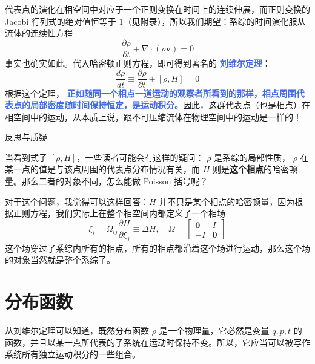 代表点的演化在相空间中对应于一个正则变换在时间上的连续伸展，而正则变换的Jacobi 行列式的绝对值恒等于 $1$（见附录），所以我们期望：系综的时间演化服从流体的连续性方程
\begin{equation}
    \frac{\partial \rho}{\partial t} + \nabla \cdot (\rho \bm{v}) = 0
\end{equation}
事实也确实如此。代入哈密顿正则方程，即可得到著名的 \textcolor{RoyalBlue}{\textbf{\kaishu 刘维尔定理}}：
\begin{equation}\label{equ:刘维尔定理}
    \frac{d \rho}{dt} \equiv \frac{\partial \rho}{\partial t} + [\rho ,H] = 0
\end{equation}
根据这个定理， \textcolor{RoyalBlue}{\textbf{\kaishu 正如随同一个相点一道运动的观察者所看到的那样，相点周围代表点的局部密度随时间保持恒定，是运动积分。}}因此，这群代表点（也是相点）在相空间中的运动，从本质上说，跟不可压缩流体在物理空间中的运动是一样的！

\begin{justification}{\kaishu 反思与质疑}
    \kaishu \fontsize{11pt}{16pt}
    
    \quad\quad 当看到式子 $[\rho , H]$，一些读者可能会有这样的疑问： $\rho$ 是系综的局部性质， $\rho$ 在某一点的值是与该点周围的代表点分布情况有关，而 $H$ 则是\textbf{这个相点}的哈密顿量。那么二者的对象不同，怎么能做 Poisson 括号呢？
    
    \quad\quad 对于这个问题，我觉得可以这样回答：$H$ 并不只是某个相点的哈密顿量，因为根据正则方程，我们实际上在整个相空间内都定义了一个相场
    \[
        \dot\xi_i = \Omega_{ij}\frac{\partial H}{\partial \xi_j} \equiv \Delta H,\quad \Omega =
        \begin{bmatrix}
            \bm{0} & I\\
            -I& \bm{0}
        \end{bmatrix}
    \]
    这个场穿过了系综内所有的相点，所有的相点都沿着这个场进行运动，那么这个场的对象当然就是整个系综了。
    \end{justification}

\section{分布函数}\label{sec:分布函数}

从刘维尔定理可以知道，既然分布函数 $\rho$ 是一个物理量，它必然是变量 $q,p,t$ 的函数，并且以某一点所代表的子系统在运动时保持不变。所以，它应当可以被写作系统所有独立运动积分的一些组合。

